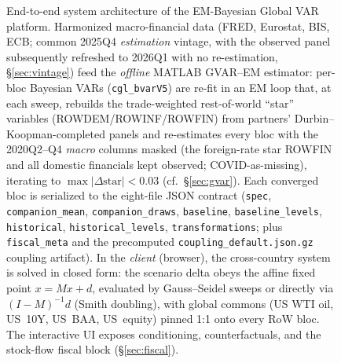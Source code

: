 \documentclass[11pt]{article}
\theoremstyle{definition}
\theoremstyle{remark}
\begin{document}
\begin{figure}[!ht]
{%
}
\caption[End-to-end system architecture]{End-to-end system architecture of the EM-Bayesian Global VAR platform.
Harmonized macro-financial data (FRED, Eurostat, BIS, ECB; common 2025Q4 \emph{estimation} vintage, with
the observed panel subsequently refreshed to 2026Q1 with no re-estimation, \S\ref{sec:vintage}) feed the
\emph{offline} MATLAB GVAR--EM estimator: per-bloc Bayesian VARs (\texttt{cgl\_bvarV5}) are re-fit in an
EM loop that, at each sweep, rebuilds the trade-weighted rest-of-world ``star'' variables
(ROWDEM/ROWINF/ROWFIN) from partners' Durbin--Koopman-completed panels and re-estimates every bloc with
the 2020Q2--Q4 \emph{macro} columns masked (the foreign-rate star ROWFIN and all domestic financials kept
observed; COVID-as-missing), iterating to $\max|\Delta\text{star}|<0.03$ (cf.\ \S\ref{sec:gvar}). Each
converged bloc is serialized to the eight-file JSON contract (\texttt{spec}, \texttt{companion\_mean},
\texttt{companion\_draws}, \texttt{baseline}, \texttt{baseline\_levels}, \texttt{historical},
\texttt{historical\_levels}, \texttt{transformations}; plus \texttt{fiscal\_meta} and the precomputed
\texttt{coupling\_default.json.gz} coupling artifact). In the \emph{client} (browser), the cross-country
system is solved in closed form: the scenario delta obeys the affine fixed point $x = Mx + d$, evaluated by
Gauss--Seidel sweeps or directly via $(I-M)^{-1}d$ (Smith doubling), with global commons (US WTI oil,
US~10Y, US~BAA, US~equity) pinned 1:1 onto every RoW bloc. The interactive UI exposes conditioning,
counterfactuals, and the stock-flow fiscal block (\S\ref{sec:fiscal}).}
\label{fig:architecture}
\end{figure}
\end{document}
